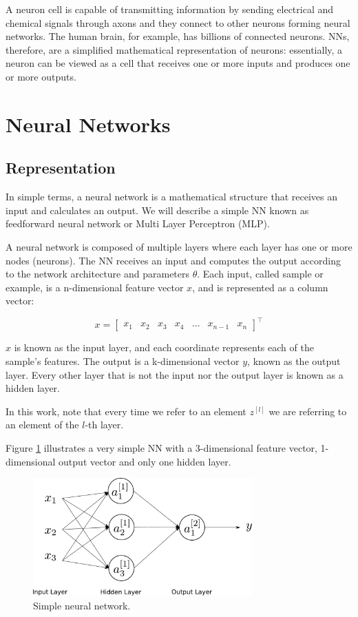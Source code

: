 A neuron cell is capable of transmitting information by sending electrical and chemical signals through axons and they connect to other neurons
forming neural networks. The human brain, for example, has billions of connected neurons.
NNs, therefore, are a simplified mathematical representation of neurons: essentially, a neuron can be viewed as a cell that receives one or more inputs
and produces one or more outputs.

\section{Neural Networks}

\subsection{Representation}
\label{sec:rep}

In simple terms, a neural network is a mathematical structure that receives an input and calculates an output.
We will describe a simple NN known as feedforward neural network or Multi Layer Perceptron (MLP).

A neural network is composed of multiple layers where each layer has one or more nodes (neurons).
The NN receives an input and computes the output according to the network architecture and parameters $\theta$.
Each input, called sample or example, is a n-dimensional feature vector $x$, and is represented as a column vector:

\begin{equation}
    x = \begin{bmatrix}
            x_1 & x_2 & x_3 & x_4 & \dots & x_{n-1} & x_{n}
        \end{bmatrix}^\intercal
\end{equation}

$x$ is known as the input layer, and each coordinate represents each of the sample's features.
The output is a k-dimensional vector $y$, known as the output layer. 
Every other layer that is not the input nor the output layer is known as a hidden layer.

In this work, note that every time we refer to an element $z^{[l]}$ we are referring to an element of the $l$-th layer.

Figure \ref{fig:neuralnet} illustrates a very simple NN with a 3-dimensional feature vector, 1-dimensional output vector and only one hidden layer.

\begin{figure}[ht]
    \centering
    \includegraphics[width=0.75\textwidth]{Chapter3/neuralnet.pdf}
    \caption{Simple neural network.}
    \label{fig:neuralnet}
\end{figure}

